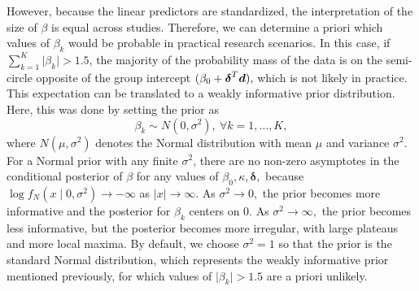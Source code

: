 However, because the linear predictors are standardized, the interpretation of the size of \( \beta \) is equal across studies. Therefore, we can determine a priori which values of \( \beta_k \) would be probable in practical research scenarios. In this case, if \( \sum_{k=1}^K \vert \beta_k \vert > 1.5 \), the majority of the probability mass of the data is on the semi-circle opposite of the group intercept \( (\beta_0 + \boldsymbol{\delta}^T \boldsymbol{d}),\) which is not likely in practice. This expectation can be translated to a weakly informative prior distribution. Here, this was done by setting the prior as
\begin{equation}
\beta_k \sim N(0, \sigma^2), ~ \forall k = 1, \dots, K,
\end{equation}
 where \( N(\mu, \sigma^2) \) denotes the Normal distribution with mean \( \mu \) and variance \( \sigma^2\). For a Normal prior with any finite \(\sigma^2\), there are no non-zero asymptotes in the conditional posterior of \(\beta\) for any values of \(\beta_0, \kappa, \boldsymbol{\delta},\) because \(\log f_N(x \mid 0, \sigma^2) \rightarrow -\infty\) as \(\vert x \vert \rightarrow \infty.\) As \( \sigma^2 \rightarrow 0,\) the prior becomes more informative and the posterior for \( \beta_k \) centers on 0. As \( \sigma^2 \rightarrow \infty,\) the prior becomes less informative, but the posterior becomes more irregular, with large plateaus and more local maxima.   By default, we choose \( \sigma^2 = 1\) so that the prior is the standard Normal distribution, which represents the weakly informative prior mentioned previously, for which values of \( \vert\beta_k\vert > 1.5 \) are a priori unlikely.

